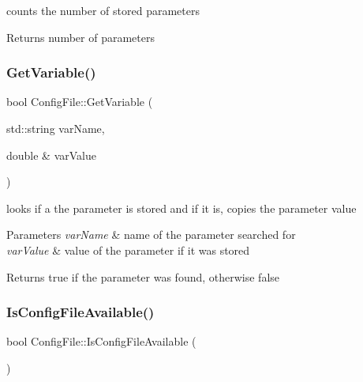 counts the number of stored parameters 

\begin{DoxyReturn}{Returns}
number of parameters 
\end{DoxyReturn}
\mbox{\label{classConfigFile_a4395577037347f2af515aaeeded9e727}} 
\subsubsection{\texorpdfstring{Get\+Variable()}{GetVariable()}}
{\footnotesize\ttfamily bool Config\+File\+::\+Get\+Variable (\begin{DoxyParamCaption}\item[{std\+::string}]{var\+Name,  }\item[{double \&}]{var\+Value }\end{DoxyParamCaption})}



looks if a the parameter is stored and if it is, copies the parameter value 


\begin{DoxyParams}{Parameters}
{\em var\+Name} & name of the parameter searched for \\
\hline
{\em var\+Value} & value of the parameter if it was stored \\
\hline
\end{DoxyParams}
\begin{DoxyReturn}{Returns}
true if the parameter was found, otherwise false 
\end{DoxyReturn}
\mbox{\label{classConfigFile_aa8874c0773572d6853b09414f16472bb}} 
\subsubsection{\texorpdfstring{Is\+Config\+File\+Available()}{IsConfigFileAvailable()}}
{\footnotesize\ttfamily bool Config\+File\+::\+Is\+Config\+File\+Available (\begin{DoxyParamCaption}{ }\end{DoxyParamCaption})}



